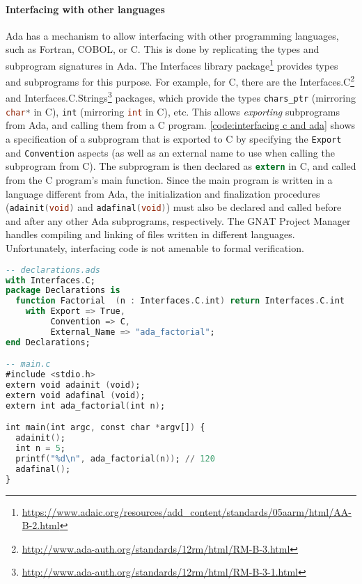 \paragraph{Interfacing with other languages}
Ada has a mechanism to allow interfacing with other programming languages, such as Fortran, COBOL, or C.
This is done by replicating the types and subprogram signatures in Ada.
The Interfaces library package\footnote{\url{https://www.adaic.org/resources/add_content/standards/05aarm/html/AA-B-2.html}} provides types and subprograms for this purpose.
For example, for C, there are the Interfaces.C\footnote{\url{http://www.ada-auth.org/standards/12rm/html/RM-B-3.html}} and Interfaces.C.Strings\footnote{\url{http://www.ada-auth.org/standards/12rm/html/RM-B-3-1.html}} packages, which provide the types \lstinline[language=Ada]{chars_ptr} (mirroring \lstinline[language=C]{char*} in C), \lstinline[language=Ada]{int} (mirroring \lstinline[language=C]{int} in C), etc.
This allows \textit{exporting} subprograms from Ada, and calling them from a C program.
\autoref{code:interfacing c and ada} shows a specification of a subprogram that is exported to C by specifying the \lstinline[language=Ada]{Export} and \lstinline[language=Ada]{Convention} aspects (as well as an external name to use when calling the subprogram from C).
The subprogram is then declared as \lstinline[language=C]{extern} in C, and called from the C program's main function.
Since the main program is written in a language different from Ada, the initialization and finalization procedures (\lstinline[language=C]{adainit(void)} and \lstinline[language=C]{adafinal(void)}) must also be declared and called before and after any other Ada subprograms, respectively.
The GNAT Project Manager handles compiling and linking of files written in different languages.
Unfortunately, interfacing code is not amenable to formal verification.

\begin{lstlisting}[float=tb,caption={Interfacing code written in C and Ada. \textnormal{declarations.adb} is omitted for brevity, but is assumed to contain an implementation of the factorial function conforming to the specification.}, label={code:interfacing c and ada}, language=Ada, alsolanguage=C]
-- declarations.ads
with Interfaces.C;
package Declarations is
  function Factorial  (n : Interfaces.C.int) return Interfaces.C.int
    with Export => True,
         Convention => C,
         External_Name => "ada_factorial";
end Declarations;

-- main.c
#include <stdio.h>
extern void adainit (void);
extern void adafinal (void);
extern int ada_factorial(int n);

int main(int argc, const char *argv[]) {
  adainit();
  int n = 5;
  printf("%d\n", ada_factorial(n)); // 120
  adafinal();
}
\end{lstlisting}

